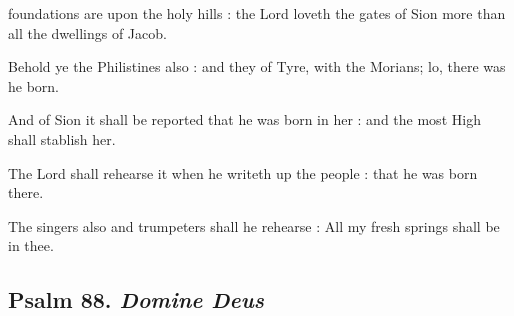 foundations are upon the holy hills : the Lord loveth the gates of Sion more than all the dwellings of Jacob.\par
{}
Behold ye the Philistines also : and they of Tyre, with the Morians; lo, there was he born.\par
{}And of Sion it shall be reported that he was born in her : and the most High shall stablish her.\par
{}The Lord shall rehearse it when he writeth up the people : that he was born there.\par
{}The singers also and trumpeters shall he rehearse : All my fresh springs shall be in thee.\par

\subsection{Psalm 88. \textit{Domine Deus}}

